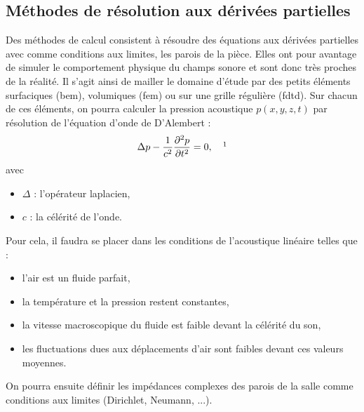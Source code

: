 	\subsection{Méthodes de résolution aux dérivées partielles} \label{sect_resExacte}

Des méthodes de calcul consistent à résoudre des équations aux dérivées partielles avec comme conditions aux limites, les parois de la pièce. Elles ont pour avantage de simuler le comportement physique du champs sonore et sont donc très proches de la réalité. Il s'agit ainsi de mailler le domaine d'étude par des petits éléments surfaciques (\gls{bem}), volumiques (\gls{fem}) ou sur une grille régulière (\gls{fdtd}). Sur chacun de ces éléments, on pourra calculer la pression acoustique $p(x,y,z,t)$ par résolution de l'équation d'onde de D'Alembert :
\begin{align} 
\Delta p-\frac{1}{c^2}\frac{\partial^2p}{\partial t^2} = 0, \ \ \ \footnotemark
\label{alembert}
\end{align}
avec
\begin{itemize}
\item $\Delta$ : l'opérateur laplacien,
\item $c$ : la célérité de l'onde.
\end{itemize}
%
Pour cela, il faudra se placer dans les conditions de l'acoustique linéaire \cite[p. 19]{jot} telles que :
%
\begin{itemize}
\item l'air est un fluide parfait,
\item la température et la pression restent constantes,
\item la vitesse macroscopique du fluide est faible devant la célérité du son,
\item les fluctuations dues aux déplacements d'air sont faibles devant ces valeurs moyennes.
\end{itemize}
%
On pourra ensuite définir les impédances complexes des parois de la salle comme conditions aux limites (\gls{Dirichlet}, \gls{Neumann}, ...). \\

